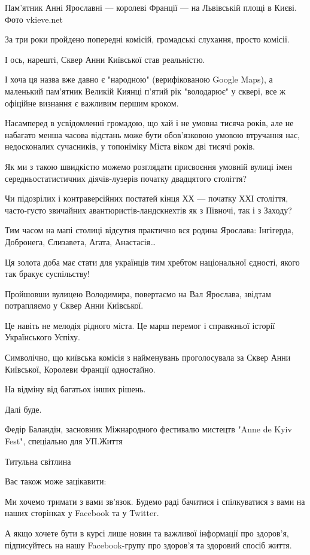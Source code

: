 \documentclass[a4paper,11pt]{extreport}
\begin{document}
Пам'ятник Анні Ярославні --- королеві Франції --- на Львівській площі в Києві.  Фото
vkieve.net

За три роки пройдено попередні комісій, громадські слухання, просто комісії.

І ось, нарешті, Сквер Анни Київської став реальністю.

І хоча ця назва вже давно є "народною" (верифікованою Google Maps), а маленький
пам’ятник Великій Киянці п’ятий рік "володарює" у сквері, все ж офіційне
визнання є важливим першим кроком.

Насамперед в усвідомленні громадою, що хай і не умовна тисяча років, але не
набагато менша часова відстань може бути обов’язковою умовою втручання нас,
недосконалих сучасників, у топоніміку Міста віком дві тисячі років.

Як ми з такою швидкістю можемо розглядати присвоєння умовній вулиці імен
середньостатистичних діячів-лузерів початку двадцятого століття?

Чи підозрілих і контраверсійних постатей кінця ХХ --- початку ХХІ століття,
часто-густо звичайних авантюристів-ландскнехтів як з Півночі, так і з Заходу?

Тим часом на мапі столиці відсутня практично вся родина Ярослава: Інгігерда,
Добронега, Єлизавета, Агата, Анастасія… 

Ця золота доба має стати для українців тим хребтом національної єдності, якого
так бракує суспільству!

Пройшовши вулицею Володимира, повертаємо на Вал Ярослава, звідтам потрапляємо у
Сквер Анни Київської.

Це навіть не мелодія рідного міста. Це марш перемог і справжньої історії
Українського Успіху.

Символічно, що київська комісія з найменувань проголосувала за Сквер Анни
Київської, Королеви Франції одностайно.

На відміну від багатьох інших рішень.

Далі буде.

Федір Баландін, засновник Міжнародного фестивалю мистецтв "Anne de Kyiv Fest",
спеціально для УП.Життя

Титульна світлина 

Вас також може зацікавити: 

Ми хочемо тримати з вами зв'язок. Будемо раді бачитися і спілкуватися з вами на
наших сторінках у Facebook та у Twitter.

А якщо хочете бути в курсі лише новин та важливої інформації про здоров'я,
підписуйтесь на нашу Facebook-групу про здоров'я та здоровий спосіб життя.
  
\end{document}

